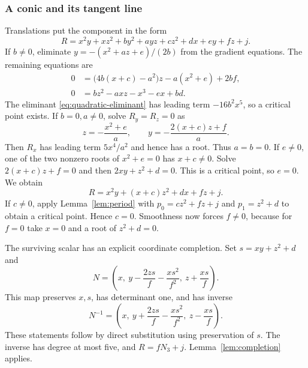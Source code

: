 \documentclass[11pt,reqno]{amsart}
\numberwithin{equation}{section}
\theoremstyle{plain}
\theoremstyle{definition}
\theoremstyle{remark}
\begin{document}
\subsubsection{A conic and its tangent line}
Translations put the component in the form
\begin{equation}\label{eq:tangent-normal}
R=x^2y+xz^2+by^2+ayz+cz^2+dx+ey+fz+j.
\end{equation}
If $b\ne0$, eliminate $y=-(x^2+az+e)/(2b)$ from the gradient equations. The remaining equations are
\[
\begin{split}
0&=\bigl(4b(x+c)-a^2\bigr)z-a(x^2+e)+2bf,\\
0&=bz^2-axz-x^3-ex+bd.
\end{split}
\]
The eliminant \eqref{eq:quadratic-eliminant} has leading term $-16b^2x^5$, so a critical point exists.
If $b=0,a\ne0$, solve $R_y=R_z=0$ as
\[
z=-\frac{x^2+e}{a},\qquad y=-\frac{2(x+c)z+f}{a}.
\]
Then $R_x$ has leading term $5x^4/a^2$ and hence has a root.
Thus $a=b=0$.
If $e\ne0$, one of the two nonzero roots of $x^2+e=0$ has $x+c\ne0$. Solve $2(x+c)z+f=0$ and then $2xy+z^2+d=0$. This is a critical point, so $e=0$. We obtain
\begin{equation}\label{eq:tangent-reduced}
R=x^2y+(x+c)z^2+dx+fz+j.
\end{equation}
If $c\ne0$, apply Lemma~\ref{lem:period} with $p_0=cz^2+fz+j$ and $p_1=z^2+d$ to obtain a critical point. Hence $c=0$.
Smoothness now forces $f\ne0$, because for $f=0$ take $x=0$ and a root of $z^2+d=0$.

The surviving scalar has an explicit coordinate completion. Set $s=xy+z^2+d$ and
\begin{equation}\label{eq:nagata-completion}
N=\left(x,\ y-\frac{2zs}{f}-\frac{xs^2}{f^2},\ z+\frac{xs}{f}\right).
\end{equation}
This map preserves $x,s$, has determinant one, and has inverse
\begin{equation}\label{eq:nagata-inverse}
N^{-1}=\left(x,\ y+\frac{2zs}{f}-\frac{xs^2}{f^2},\ z-\frac{xs}{f}\right).
\end{equation}
These statements follow by direct substitution using preservation of $s$. The inverse has degree at most five, and $R=fN_3+j$. Lemma~\ref{lem:completion} applies.
\end{document}
